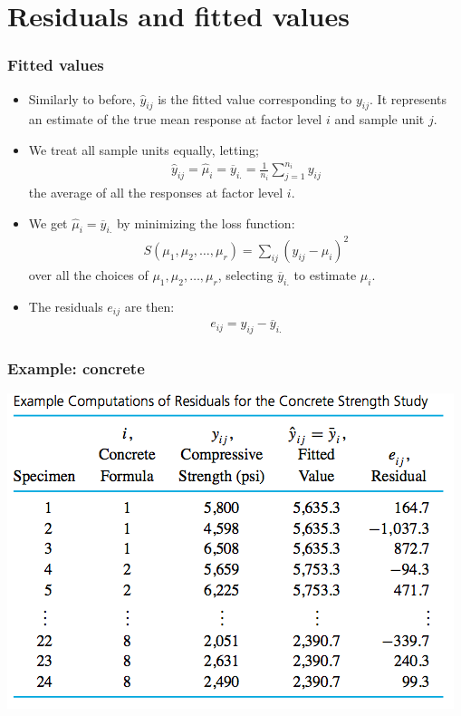 \documentclass[handout]{beamer}\usepackage[]{graphicx}\usepackage[]{color}
\providecommand{\ov}[1]{\overline{#1}}
\providecommand{\wh}[1]{\widehat{#1}}
\numberwithin{equation}{section}
\begin{document}
\section{Residuals and fitted values}

\begin{frame}
\frametitle{Fitted values} \small
\begin{itemize}
\item Similarly to before, $\wh{y}_{ij}$ is the fitted value corresponding to $y_{ij}$. It represents an estimate of the true mean response at factor level $i$ and sample unit $j$.
\pause \item We treat all sample units equally, letting;
\pause \begin{align*}
\wh{y}_{ij} = \hat{\mu}_i =\ov{y}_{i.} = \frac{1}{n_i} \sum_{j=1}^{n_i} y_{ij}
\end{align*}
\pause the average of all the responses at factor level $i$.
\pause \item We get $\wh{\mu}_{i} = \ov{y}_{i.}$ by minimizing the loss function:
\pause \begin{align*}
S(\mu_1, \mu_2, \ldots, \mu_r) = \sum_{ij}(y_{ij} - \mu_i)^2
\end{align*}
over all the choices of $\mu_1, \mu_2, \ldots, \mu_r$, selecting $\ov{y}_{i.}$ to estimate $\mu_i$. 
\pause \item The residuals $e_{ij}$ are then:
\begin{align*}
e_{ij} = y_{ij} - \ov{y}_{i.}
\end{align*}
\end{itemize}
\end{frame}



\begin{frame}
\frametitle{Example: concrete}
\begin{center}
 \includegraphics{../../fig/concreteresd.png}
\end{center}
\end{frame}
\end{document}
